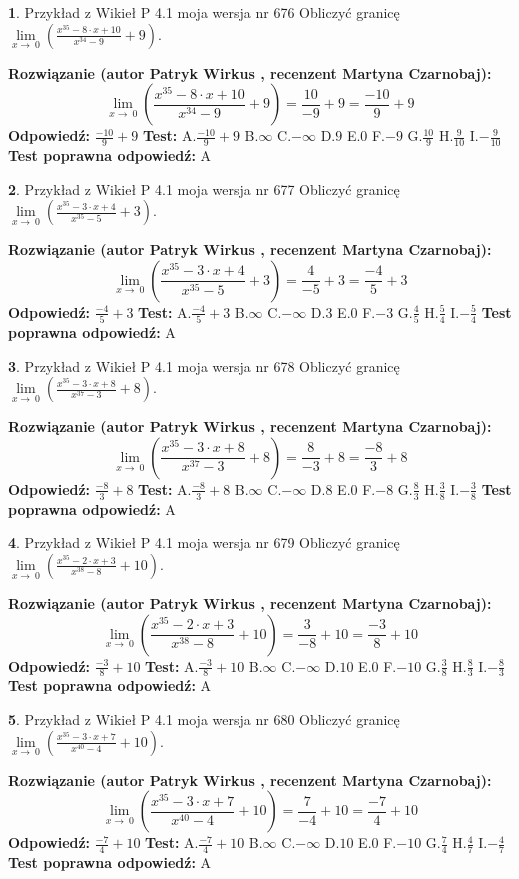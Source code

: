 \documentclass[12pt, a4paper]{article}
\theoremstyle{definition} %
\newtheorem{zad}{}
\newcommand{\zadStart}[1]{\begin{zad}#1\newline}
\newcommand{\zadStop}{\end{zad}}
\newcommand{\rozwStart}[2]{\noindent \textbf{Rozwiązanie (autor #1 , recenzent #2): }\newline}
\newcommand{\rozwStop}{\newline}
\newcommand{\odpStart}{\noindent \textbf{Odpowiedź:}\newline}
\newcommand{\odpStop}{\newline}
\newcommand{\testStart}{\noindent \textbf{Test:}\newline}
\newcommand{\testStop}{\newline}
\newcommand{\kluczStart}{\noindent \textbf{Test poprawna odpowiedź:}\newline}
\newcommand{\kluczStop}{\newline}
\begin{document}
\zadStart{Przykład z Wikieł P 4.1 moja wersja nr 676}
Obliczyć granicę $\lim\limits_{x\to\ 0}(\frac{x^{35}-8 \cdot x +10}{x^{34}-9}+9)$.
\zadStop
\rozwStart{Patryk Wirkus}{Martyna Czarnobaj}
$$\lim\limits_{x\to\ 0}(\frac{x^{35}-8 \cdot x +10}{x^{34}-9}+9)=\frac{10}{-9}+9=\frac{-10}{9}+9$$
\rozwStop
\odpStart
$\frac{-10}{9}+9$
\odpStop
\testStart
A.$\frac{-10}{9}+9$
B.$\infty$
C.$-\infty$
D.$9$
E.$0$
F.$-9$
G.$\frac{10}{9}$
H.$\frac{9}{10}$
I.$-\frac{9}{10}$
\testStop
\kluczStart
A
\kluczStop



\zadStart{Przykład z Wikieł P 4.1 moja wersja nr 677}
Obliczyć granicę $\lim\limits_{x\to\ 0}(\frac{x^{35}-3 \cdot x +4}{x^{35}-5}+3)$.
\zadStop
\rozwStart{Patryk Wirkus}{Martyna Czarnobaj}
$$\lim\limits_{x\to\ 0}(\frac{x^{35}-3 \cdot x +4}{x^{35}-5}+3)=\frac{4}{-5}+3=\frac{-4}{5}+3$$
\rozwStop
\odpStart
$\frac{-4}{5}+3$
\odpStop
\testStart
A.$\frac{-4}{5}+3$
B.$\infty$
C.$-\infty$
D.$3$
E.$0$
F.$-3$
G.$\frac{4}{5}$
H.$\frac{5}{4}$
I.$-\frac{5}{4}$
\testStop
\kluczStart
A
\kluczStop



\zadStart{Przykład z Wikieł P 4.1 moja wersja nr 678}
Obliczyć granicę $\lim\limits_{x\to\ 0}(\frac{x^{35}-3 \cdot x +8}{x^{37}-3}+8)$.
\zadStop
\rozwStart{Patryk Wirkus}{Martyna Czarnobaj}
$$\lim\limits_{x\to\ 0}(\frac{x^{35}-3 \cdot x +8}{x^{37}-3}+8)=\frac{8}{-3}+8=\frac{-8}{3}+8$$
\rozwStop
\odpStart
$\frac{-8}{3}+8$
\odpStop
\testStart
A.$\frac{-8}{3}+8$
B.$\infty$
C.$-\infty$
D.$8$
E.$0$
F.$-8$
G.$\frac{8}{3}$
H.$\frac{3}{8}$
I.$-\frac{3}{8}$
\testStop
\kluczStart
A
\kluczStop



\zadStart{Przykład z Wikieł P 4.1 moja wersja nr 679}
Obliczyć granicę $\lim\limits_{x\to\ 0}(\frac{x^{35}-2 \cdot x +3}{x^{38}-8}+10)$.
\zadStop
\rozwStart{Patryk Wirkus}{Martyna Czarnobaj}
$$\lim\limits_{x\to\ 0}(\frac{x^{35}-2 \cdot x +3}{x^{38}-8}+10)=\frac{3}{-8}+10=\frac{-3}{8}+10$$
\rozwStop
\odpStart
$\frac{-3}{8}+10$
\odpStop
\testStart
A.$\frac{-3}{8}+10$
B.$\infty$
C.$-\infty$
D.$10$
E.$0$
F.$-10$
G.$\frac{3}{8}$
H.$\frac{8}{3}$
I.$-\frac{8}{3}$
\testStop
\kluczStart
A
\kluczStop



\zadStart{Przykład z Wikieł P 4.1 moja wersja nr 680}
Obliczyć granicę $\lim\limits_{x\to\ 0}(\frac{x^{35}-3 \cdot x +7}{x^{40}-4}+10)$.
\zadStop
\rozwStart{Patryk Wirkus}{Martyna Czarnobaj}
$$\lim\limits_{x\to\ 0}(\frac{x^{35}-3 \cdot x +7}{x^{40}-4}+10)=\frac{7}{-4}+10=\frac{-7}{4}+10$$
\rozwStop
\odpStart
$\frac{-7}{4}+10$
\odpStop
\testStart
A.$\frac{-7}{4}+10$
B.$\infty$
C.$-\infty$
D.$10$
E.$0$
F.$-10$
G.$\frac{7}{4}$
H.$\frac{4}{7}$
I.$-\frac{4}{7}$
\testStop
\kluczStart
A
\kluczStop
\end{document}
